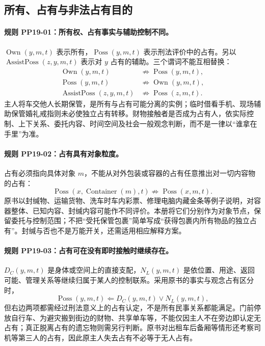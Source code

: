 \subsection{所有、占有与非法占有目的}
\paragraph{规则 PP19-01：所有权、占有事实与辅助控制不同。}
\mbox{}\par
$\operatorname{Own}(y,m,t)$ 表示所有，$\operatorname{Poss}(y,m,t)$ 表示刑法评价中的占有。另以 $\operatorname{AssistPoss}(z,y,m,t)$ 表示对 $y$ 占有的辅助。三个谓词不能互相替换：
\[
\begin{aligned}
\operatorname{Own}(y,m,t)&\not\Rightarrow\operatorname{Poss}(y,m,t),\\
\operatorname{Poss}(y,m,t)&\not\Rightarrow\operatorname{Own}(y,m,t),\\
\operatorname{AssistPoss}(z,y,m,t)&\not\Rightarrow\operatorname{Poss}(z,m,t).
\end{aligned}
\]
主人将车交他人长期保管，是所有与占有可能分离的实例；临时借看手机、现场辅助保管婚礼戒指则未必使独立占有转移。财物接触者是否成为占有人，依实际控制、上下关系、委托内容、时间空间及社会一般观念判断，而不是一律以“谁拿在手里”为准。

\paragraph{规则 PP19-02：占有具有对象粒度。}
\mbox{}\par
占有必须指向具体对象 $m$，不能从对外包装或容器的占有任意推出对一切内容物的占有：
\[
\operatorname{Poss}(x,\operatorname{Container}(m),t)
\not\Rightarrow\operatorname{Poss}(x,m,t).
\]
原书以封缄物、运输货物、洗车时车内彩票、修理电脑内藏金条等例子说明，对容器整体、已知内容、封缄内容可能作不同评价。本册将它们分别作为对象节点，保留委托与控制范围；不把“受托保管包裹”简单写成“获得包裹内所有物品的独立占有”。封缄与否也不是万能开关，还需适用相应解释方案。

\paragraph{规则 PP19-03：占有可在没有即时接触时继续存在。}
\mbox{}\par
${D_C}(y,m,t)$ 是身体或空间上的直接支配，${N_L}(y,m,t)$ 是依位置、用途、返回可能、管理关系等继续归属于某人的控制联系。采用原书的事实与观念占有区分时，
\[
\operatorname{Poss}(y,m,t)
\Leftarrow{D_C}(y,m,t)
\lor{N_L}(y,m,t),
\]
但右边两项都需经过刑法意义上的占有认定，不是所有民事关系都能满足。门前停放自行车、为避灾搬到街边的财物、共享单车等，不能仅因主人不在旁边即认定无占有；真正脱离占有的遗忘物则需另行判断。原书对出租车后备厢等情形还考察司机等第三人的占有，因此原主人失去占有不必等于无人占有。

